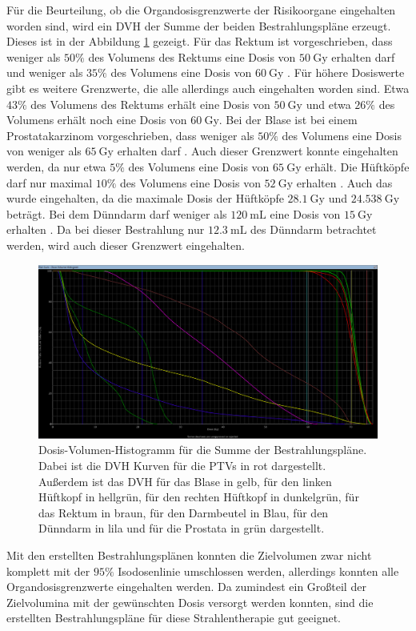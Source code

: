 Für die Beurteilung, ob die Organdosisgrenzwerte der Risikoorgane eingehalten worden sind,
wird ein DVH der Summe der beiden Bestrahlungspläne erzeugt. Dieses ist in der Abbildung
\ref{abb:DVHsum} gezeigt. Für das Rektum ist vorgeschrieben, dass
weniger als $50\%$ des Volumens des Rektums eine Dosis von $\SI{50}{\gray}$ erhalten darf und weniger als $35\%$
des Volumens eine Dosis von $\SI{60}{\gray}$ \cite{QUANTEC}. Für höhere Dosiswerte gibt es weitere Grenzwerte, die alle allerdings auch
eingehalten worden sind. Etwa $43\%$ des Volumens des Rektums erhält eine Dosis von $\SI{50}{\gray}$ und etwa $26\%$ des Volumens erhält noch eine
Dosis von $\SI{60}{\gray}$.
Bei der Blase ist bei einem Prostatakarzinom vorgeschrieben, dass weniger als $50\%$ des Volumens eine Dosis von weniger als $\SI{65}{\gray}$
erhalten darf \cite{QUANTEC}. Auch dieser Grenzwert konnte eingehalten werden, da nur etwa $5\%$ des Volumens eine Dosis von $\SI{65}{\gray}$
erhält. Die Hüftköpfe darf nur maximal $10\%$ des Volumens eine Dosis von $\SI{52}{\gray}$ erhalten \cite{QUANTEC}. Auch das wurde eingehalten, da
die maximale Dosis der Hüftköpfe $\SI{28.1}{\gray}$ und $\SI{24.538}{\gray}$ beträgt.
Bei dem Dünndarm darf weniger als $\SI{120}{\milli\liter}$ eine Dosis von $\SI{15}{\gray}$ erhalten \cite{QUANTEC}. Da
bei dieser Bestrahlung nur $\SI{12.3}{\milli\liter}$ des Dünndarm betrachtet werden, wird auch dieser Grenzwert eingehalten.


\begin{figure}[H]
  \centering
  \includegraphics[width=\textwidth]{Bilder/DVHsum.png}
  \caption{Dosis-Volumen-Histogramm  für die Summe der Bestrahlungspläne. Dabei ist die DVH Kurven für die PTVs in rot dargestellt. Außerdem ist das DVH für das Blase in gelb, für den linken Hüftkopf in hellgrün, für den rechten Hüftkopf in dunkelgrün, für das Rektum in braun, für den Darmbeutel in Blau, für den Dünndarm in lila und für die Prostata in grün dargestellt.}
  \label{abb:DVHsum}
\end{figure}

Mit den erstellten Bestrahlungsplänen konnten die Zielvolumen zwar nicht komplett
mit der $95\%$ Isodosenlinie umschlossen werden, allerdings konnten alle Organdosisgrenzwerte
eingehalten werden. Da zumindest ein Großteil der Zielvolumina mit der gewünschten
Dosis versorgt werden konnten, sind die erstellten Bestrahlungspläne für diese Strahlentherapie gut geeignet.
